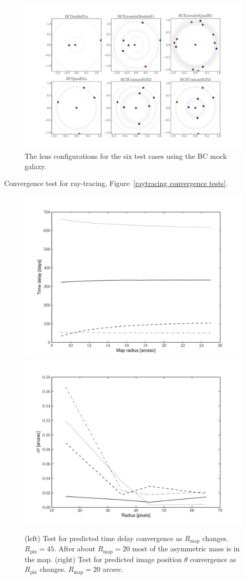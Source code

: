 \documentclass[usenatbib,onecolumn,galley]{mn2e}
\newcommand{\Rmap}{\ensuremath{R_\mathrm{map}}}
\newcommand{\Rpix}{\ensuremath{R_\mathrm{pix}}}
\newcommand{\figref}[1] {Figure~\ref{#1}}
\begin{document}
\begin{figure}
\begin{center}
\includegraphics[width=.8\columnwidth]{BCarrival_surfaces}
\end{center}
\caption{The lens configurations for the six test cases using the BC
  mock galaxy.}
\label{reconstruction}
\end{figure}

Convergence test for ray-tracing, \figref{raytracing convergence
  tests}.

\begin{figure}
\begin{center}
\includegraphics[width=.4\columnwidth]{tdconv_pr45.pdf}\hfil
\includegraphics[width=.4\columnwidth]{imgpos_conv_mr20.pdf}
\end{center}
\caption{(left) Test for predicted time delay convergence as $\Rmap$
  changes.  $\Rpix=45$. After about $\Rmap=20$ most of the asymmetric
  mass is in the map.  (right) Test for predicted image position
  $\theta$ convergence as $\Rpix$ changes. $\Rmap=20$ arcsec.}
\label{raytracing convergence tests}
\end{figure}
\end{document}
